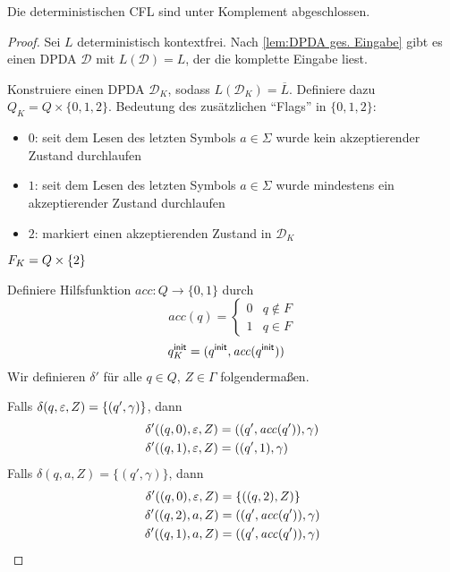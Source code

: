 \begin{Satz}[name={[Abgeschlossenheit der deterministischen \acs*{CFL}]}]
        Die deterministischen \ac{CFL} sind unter Komplement abgeschlossen.
\end{Satz}
\begin{proof}
  Sei $L$ deterministisch kontextfrei. 
  Nach \autoref{lem:DPDA ges. Eingabe} gibt es einen \ac{DPDA} $\mathcal{D}$ mit $L(\mathcal{D})=L$, der die komplette Eingabe liest.

  Konstruiere einen \ac{DPDA} $\mathcal{D}_K$, sodass $ L(\mathcal{D}_K) = \overline{L}$. 
  Definiere dazu $Q_K= Q \times \{0,1,2\}$. Bedeutung des zusätzlichen "`Flags"' in $\{0,1,2\}$:
  \begin{itemize}
  \item $0$: seit dem Lesen des letzten Symbols $a \in \Sigma$ wurde kein akzeptierender Zustand durchlaufen
  \item $1$: seit dem Lesen des letzten Symbols $a \in \Sigma$ wurde mindestens ein
    akzeptierender Zustand durchlaufen 
  \item $2$: markiert einen akzeptierenden Zustand in $\mathcal{D}_K$
  \end{itemize}
        
  $F_K=Q\times \{2\}$

  Definiere Hilfsfunktion $\mathit{acc}:Q\to \{0,1\}$ durch 
  \begin{displaymath}
    \mathit{acc} (q) =
    \begin{cases}
      0 & q\notin F \\ 1 & q \in F
    \end{cases}
  \end{displaymath}
  \begin{align*}
    q^\mathsf{init}_K &= (q^\mathsf{init},\mathit{acc} (q^\mathsf{init}))
  \end{align*}
  Wir definieren $\delta'$ für alle $q \in Q$, $Z\in\Gamma$ folgendermaßen.
  
  Falls $\delta(q,\varepsilon,Z) = \{(q',\gamma)\}$, dann
  \begin{align*}
    \delta'((q,0),\varepsilon,Z) &= ((q',\mathit{acc} (q')),\gamma)
    \\
    \delta'((q,1),\varepsilon,Z) &= ((q',1),\gamma)
  \end{align*}
  Falls $\delta(q,a,Z) = \{(q',\gamma)\}$, dann
  \begin{align*}
    \delta'((q,0), \Eps, Z) &= \{ ((q,2), Z) \} \\
    \delta'((q,2), a, Z) &=((q',\mathit{acc} (q')), \gamma)
    \\
    \delta'((q,1), a, Z) &=
    ((q',\mathit{acc} (q')), \gamma)
    \qedhere    %
  \end{align*}
\end{proof}

